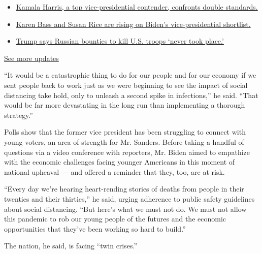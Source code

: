 \begin{itemize}
\tightlist
\item
  \href{https://www.nytimes.com/2020/07/31/us/elections/biden-vs-trump.html?action=click\&pgtype=Article\&state=default\&region=MAIN_CONTENT_1\&context=storylines_live_updates\#link-29fdff45}{Kamala
  Harris, a top vice-presidential contender, confronts double
  standards.}
\item
  \href{https://www.nytimes.com/2020/07/31/us/elections/biden-vs-trump.html?action=click\&pgtype=Article\&state=default\&region=MAIN_CONTENT_1\&context=storylines_live_updates\#link-13ec3d9c}{Karen
  Bass and Susan Rice are rising on Biden's vice-presidential
  shortlist.}
\item
  \href{https://www.nytimes.com/2020/07/31/us/elections/biden-vs-trump.html?action=click\&pgtype=Article\&state=default\&region=MAIN_CONTENT_1\&context=storylines_live_updates\#link-49e9a016}{Trump
  says Russian bounties to kill U.S. troops `never took place.'}
\end{itemize}

\href{https://www.nytimes.com/2020/07/31/us/elections/biden-vs-trump.html?action=click\&pgtype=Article\&state=default\&region=MAIN_CONTENT_1\&context=storylines_live_updates}{See
more updates}

``It would be a catastrophic thing to do for our people and for our
economy if we sent people back to work just as we were beginning to see
the impact of social distancing take hold, only to unleash a second
spike in infections,'' he said. ``That would be far more devastating in
the long run than implementing a thorough strategy.''

Polls show that the former vice president has been struggling to connect
with young voters, an area of strength for Mr. Sanders. Before taking a
handful of questions via a video conference with reporters, Mr. Biden
aimed to empathize with the economic challenges facing younger Americans
in this moment of national upheaval --- and offered a reminder that
they, too, are at risk.

``Every day we're hearing heart-rending stories of deaths from people in
their twenties and their thirties,'' he said, urging adherence to public
safety guidelines about social distancing. ``But here's what we must not
do. We must not allow this pandemic to rob our young people of the
futures and the economic opportunities that they've been working so hard
to build.''

The nation, he said, is facing ``twin crises.''

